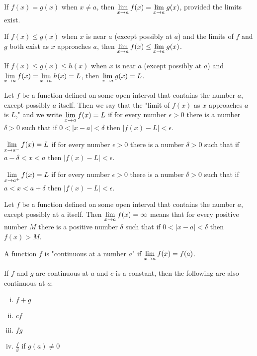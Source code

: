 \documentclass[a4paper,11pt]{article}
\begin{document}
\begin{outline}
    If \(f(x) = g(x)\) when \(x \neq a\), then \(\xlimit{x}{a}f(x) = \xlimit{x}{a}g(x)\), provided the
    limits exist.
    
    If \(f(x) \leq g(x)\) when \(x\) is near \(a\) (except possibly at \(a\)) and the limits of
    \(f\) and \(g\) both exist as \(x\) approaches \(a\), then \(\xlimit{x}{a} f(x) \leq \xlimit{x}{a} g(x)\).
    
    If \(f(x) \leq g(x) \leq h(x)\) when \(x\) is near \(a\) (except possibly at \(a\)) and \(\xlimit{x}{a}f(x) =
    \xlimit{x}{a}h(x) = L\), then \(\xlimit{x}{a} g(x) = L\).
    
    Let \(f\) be a function defined on some open interval that contains the number \(a\), except possibly \(a\)
    itself. Then we say that the "limit of \(f(x)\) as \(x\) approaches \(a\) is \(L\)," and we write 
    \(\xlimit{x}{a} f(x) = L\) if for every number \(\epsilon > 0\) there is a number \(\delta > 0\) such that
    if \(0 < |x - a| < \delta\) then \(|f(x)-L| < \epsilon\).
    
    \(\xlimit[-]{x}{a} f(x) = L\) if for every number \(\epsilon > 0\) there is a number \(\delta > 0\)
    such that if \(a - \delta < x < a\) then \(|f(x)-L| < \epsilon\).
    
    \(\xlimit[+]{x}{a} f(x) = L\) if for every number \(\epsilon > 0\) there is a number \(\delta > 0\) such
    that if \(a < x < a + \delta\) then \(|f(x)-L| < \epsilon\).
    
    Let \(f\) be a function defined on some open interval that contains the number \(a\), except possibly at
    \(a\) itself. Then \(\xlimit{x}{a} f(x) = \infty\) means that for every positive number \(M\) there is a
    positive number \(\delta\) such that if \(0 < |x-a| < \delta\) then \(f(x) > M\).
    
    A function \(f\) is "continuous at a number \(a\)" if \(\xlimit{x}{a} f(x) = f(a)\).
    
    If \(f\) and \(g\) are continuous at \(a\) and \(c\) is a constant, then the following are also 
    continuous at \(a\):
    \begin{enumerate}[i.]
      \item \(f + g\)
      \item \(cf\)
      \item \(fg\)
      \item \(\frac{f}{g}\) if \(g(a) \neq 0\)
    \end{enumerate}


\end{outline}
\end{document}

